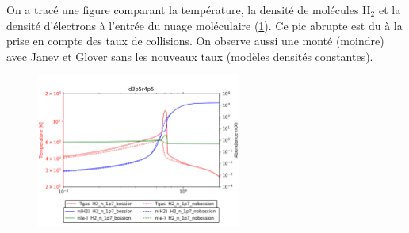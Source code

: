 On a tracé une figure comparant la température, la densité de molécules $\mathrm{H}_2$ et la densité d'électrons à l'entrée du nuage moléculaire (\ref{fig:recomb:comp}). Ce pic abrupte est du à la prise en compte des taux de collisions. On observe aussi une monté (moindre) avec Janev et Glover sans les nouveaux taux (modèles densités constantes).

\begin{figure}
    \centering
    \includegraphics[trim = {0 0 0 0},clip,width=0.6\textwidth]{figure/H2/rec_elec/nT_H2_H2_n_1p7_bossion_H2_n_1p7_nobossion.png}
    \caption{}
    \label{fig:recomb:comp}
\end{figure}
